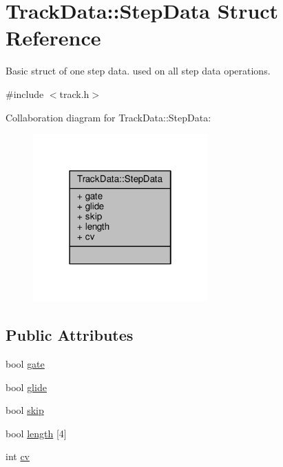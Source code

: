 \hypertarget{structTrackData_1_1StepData}{\section{Track\-Data\-:\-:Step\-Data Struct Reference}
\label{structTrackData_1_1StepData}
}


Basic struct of one step data. used on all step data operations.  




{\ttfamily \#include $<$track.\-h$>$}



Collaboration diagram for Track\-Data\-:\-:Step\-Data\-:\nopagebreak
\begin{figure}[H]
\begin{center}
\leavevmode
\includegraphics[width=190pt]{structTrackData_1_1StepData__coll__graph}
\end{center}
\end{figure}
\subsection*{Public Attributes}
\begin{DoxyCompactItemize}
\item 
bool \hyperlink{structTrackData_1_1StepData_a3d44ed4a2b85f2c8c73687b4c1c07b1d}{gate}
\item 
bool \hyperlink{structTrackData_1_1StepData_a463a1c0acf02277e2fcb9019adf280d3}{glide}
\item 
bool \hyperlink{structTrackData_1_1StepData_adf3912b411e7caa1e98cb2ad16d79fa0}{skip}
\item 
bool \hyperlink{structTrackData_1_1StepData_a6a472e262e19bd2b2be75d3332481dec}{length} \mbox{[}4\mbox{]}
\item 
int \hyperlink{structTrackData_1_1StepData_a67ecaedf95ce95b8a92ecf1990644214}{cv}
\end{DoxyCompactItemize}



